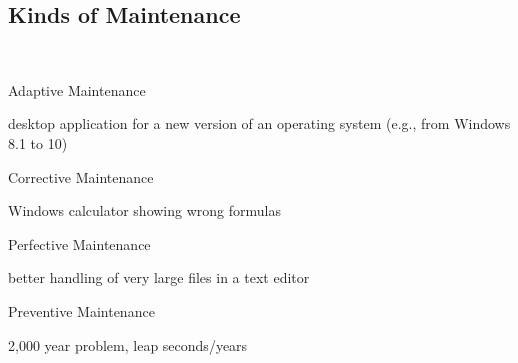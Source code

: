 \subsection{Kinds of Maintenance}
\begin{frame}{\insertsubsection\ \mytitlesource{\ludewiglichter}}
	\begin{fancycolumns}
		\begin{definition}{Adaptive Maintenance \mysource{\lientzswanson}}
			 \hfill {}
		\end{definition}
		\begin{example}{}
			desktop application for a new version of an operating system (e.g., from Windows 8.1 to 10)
		\end{example}
		\begin{definition}{Corrective Maintenance \mysource{\lientzswanson}}
			 \hfill {}
		\end{definition}
		\begin{example}{}
			Windows calculator showing wrong formulas
		\end{example}
		\nextcolumn
		\begin{definition}{Perfective Maintenance \mysource{\lientzswanson}}
			 \hfill {}
		\end{definition}
		\begin{example}{}
			better handling of very large files in a text editor
		\end{example}
		\begin{definition}{Preventive Maintenance \mysource{\lientzswanson}}
			 \hfill {}
		\end{definition}
		\begin{example}{}
			2,000 year problem, leap seconds/years
		\end{example}
	\end{fancycolumns}
\end{frame}

